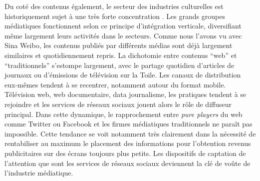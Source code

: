 Du coté des contenus également, le secteur des industries culturelles est historiquement sujet à une très forte concentration \cite{Martel2010}. Les grands groupes médiatiques fonctionnent selon ce principe d'intégration verticale, diversifiant même largement leurs activités dans le secteurs. Comme nous l'avons vu avec Sina Weibo, les contenus publiés par différents médias sont déjà largement similaires et quotidiennement repris. La dichotomie entre contenus ``web'' et ``traditionnels'' s'estompe largement, avec le partage quotidien d'articles de journaux ou d'émissions de télévision sur la Toile. Les canaux de distribution eux-mêmes tendent à se recentrer, notamment autour du format mobile. Télévision web,  web documentaire, data journalisme, les pratiques tendent à se rejoindre et les services de réseaux sociaux jouent alors le rôle de diffuseur principal. Dans cette dynamique, le rapprochement entre \textit{pure players} du web comme Twitter ou Facebook et les firmes médiatiques traditionnels ne paraît pas impossible. Cette tendance se voit notamment très clairement dans la nécessité de rentabiliser au maximum le placement des informations pour l'obtention revenus publicitaires sur des écrans toujours plus petits. Les dispositifs de captation de l'attention que sont les services de réseaux sociaux deviennent la clé de voûte de l'industrie médiatique. 

